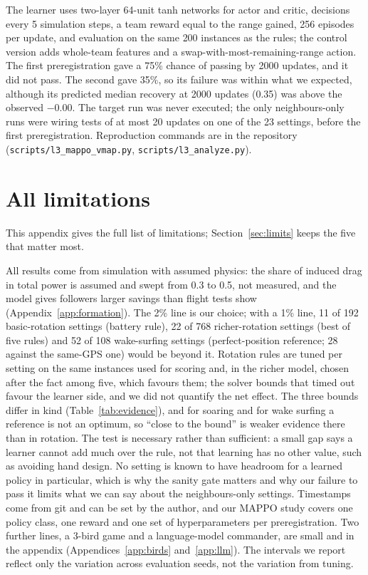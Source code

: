 \documentclass[11pt]{article}
\begin{document}
The learner uses two-layer 64-unit tanh networks for actor and critic, decisions every 5 simulation steps, a team reward equal to the range gained, 256 episodes per update, and evaluation on the same 200 instances as the rules; the control version adds whole-team features and a swap-with-most-remaining-range action.
The first preregistration gave a 75\% chance of passing by 2000 updates, and it did not pass. The second gave 35\%, so its failure was within what we expected, although its predicted median recovery at 2000 updates (0.35) was above the observed $-0.00$.
The target run was never executed; the only neighbours-only runs were wiring tests of at most 20 updates on one of the 23 settings, before the first preregistration.
Reproduction commands are in the repository (\texttt{scripts/l3\_mappo\_vmap.py}, \texttt{scripts/l3\_analyze.py}).

\section{All limitations}
\label{app:limits}

This appendix gives the full list of limitations; Section~\ref{sec:limits} keeps the five that matter most.

All results come from simulation with assumed physics: the share of induced drag in total power is assumed and swept from 0.3 to 0.5, not measured, and the model gives followers larger savings than flight tests show (Appendix~\ref{app:formation}).
The 2\% line is our choice; with a 1\% line, 11 of 192 basic-rotation settings (battery rule), 22 of 768 richer-rotation settings (best of five rules) and 52 of 108 wake-surfing settings (perfect-position reference; 28 against the same-GPS one) would be beyond it.
Rotation rules are tuned per setting on the same instances used for scoring and, in the richer model, chosen after the fact among five, which favours them; the solver bounds that timed out favour the learner side, and we did not quantify the net effect.
The three bounds differ in kind (Table~\ref{tab:evidence}), and for soaring and for wake surfing a reference is not an optimum, so ``close to the bound'' is weaker evidence there than in rotation.
The test is necessary rather than sufficient: a small gap says a learner cannot add much over the rule, not that learning has no other value, such as avoiding hand design.
No setting is known to have headroom for a learned policy in particular, which is why the sanity gate matters and why our failure to pass it limits what we can say about the neighbours-only settings.
Timestamps come from git and can be set by the author, and our MAPPO study covers one policy class, one reward and one set of hyperparameters per preregistration.
Two further lines, a 3-bird game and a language-model commander, are small and in the appendix (Appendices~\ref{app:birds} and~\ref{app:llm}).
The intervals we report reflect only the variation across evaluation seeds, not the variation from tuning.
\end{document}
